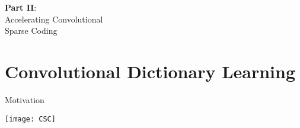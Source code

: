 \documentclass[defense.tex]{subfiles}
\begin{document}
\begin{frame}{}

\centering\Huge {\color{darkred}\textbf {Part II}}:\\
Accelerating Convolutional\\Sparse Coding\\
\biblio{}
	
\end{frame}


\section{Convolutional Dictionary Learning}


\begin{frame}{Motivation}

	\centering
	\texttt{[image: CSC]}

\end{frame}


%
%
\end{document}
